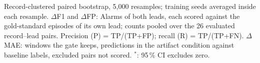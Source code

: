 \begin{table}[htbp]
\par\smallskip\footnotesize Record-clustered paired bootstrap, 5,000 resamples; training seeds averaged inside each resample. $\Delta$F1 and $\Delta$FP: Alarms of both leads, each scored against the gold-standard episodes of its own lead; counts pooled over the 26 evaluated record--lead pairs. Precision (P) = TP/(TP+FP); recall (R) = TP/(TP+FN). $\Delta$MAE: windows the gate keeps, predictions in the artifact condition against baseline labels, excluded pairs not scored. $^{*}$: 95\,\% CI excludes zero.
\end{table}
